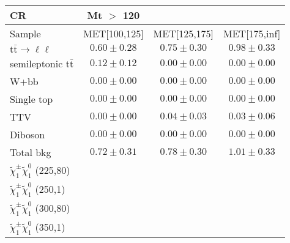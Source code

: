 \begin{table}
\begin{center}
\small
\begin{tabular}{lccc}
\hline
CR &  Mt $>$ 120 & &\\
\hline
Sample&MET[100,125]&MET[125,175]&MET[175,inf]\\
\hline
$\mathrm{t}\bar{\mathrm{t}}\rightarrow \ell\ell$&$0.60\pm0.28$&$0.75\pm0.30$&$0.98\pm0.33$\\
semileptonic $\mathrm{t}\bar{\mathrm{t}}$&$0.12\pm0.12$&$0.00\pm0.00$&$0.00\pm0.00$\\
W+bb&$0.00\pm0.00$&$0.00\pm0.00$&$0.00\pm0.00$\\
Single top&$0.00\pm0.00$&$0.00\pm0.00$&$0.00\pm0.00$\\
TTV&$0.00\pm0.00$&$0.04\pm0.03$&$0.03\pm0.06$\\
Diboson&$0.00\pm0.00$&$0.00\pm0.00$&$0.00\pm0.00$\\
\hline
Total bkg&$0.72\pm0.31$&$0.78\pm0.30$&$1.01\pm0.33$\\
$\tilde{\chi}_{1}^{\pm}\tilde{\chi}_{1}^{0}$ (225,80)\\
$\tilde{\chi}_{1}^{\pm}\tilde{\chi}_{1}^{0}$ (250,1)\\
$\tilde{\chi}_{1}^{\pm}\tilde{\chi}_{1}^{0}$ (300,80)\\
$\tilde{\chi}_{1}^{\pm}\tilde{\chi}_{1}^{0}$ (350,1)\\
\hline
\hline\hline
\end{tabular}
\end{center}
\end{table}
